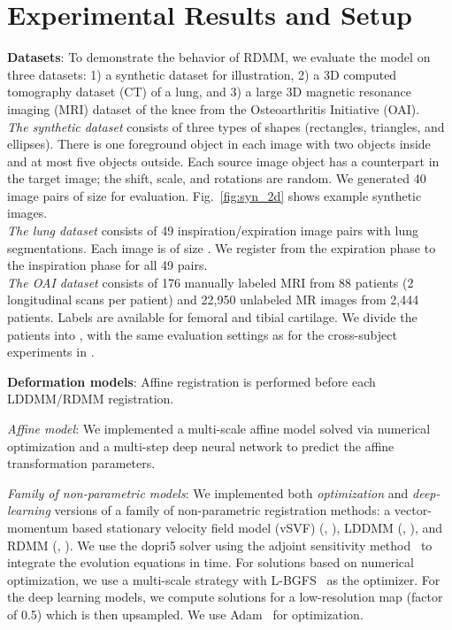 \documentclass{article}
\numberwithin{equation}{section}
\newcommand{\zy}[1]{{\color{black}{#1}}}
\begin{document}
\section{Experimental Results and Setup}
\label{sec:experimental_results}
 {\bf Datasets}: To demonstrate the behavior of RDMM, we evaluate the model on three datasets: 1) a synthetic dataset for illustration, 2) a 3D computed tomography dataset (CT) of a lung, and 3) a large 3D magnetic resonance imaging (MRI) dataset of the knee from the Osteoarthritis Initiative (OAI).\\
{\it The synthetic dataset} consists of three types of shapes (rectangles, triangles, and ellipses). There is one foreground object in each image with two objects inside and at most five objects outside. Each source image object  has a counterpart in the target image; the shift, scale, and rotations are random. We generated 40 image pairs of size  for evaluation. Fig.~\ref{fig:syn_2d} shows example synthetic images.\\
{\it The lung dataset} consists of 49 inspiration/expiration image pairs with lung segmentations. Each image is of size . We register from the expiration phase to the inspiration phase for all 49 pairs.\\
{\it The OAI dataset} consists of 176 manually labeled MRI from 88 patients (2 longitudinal scans per patient) and 22,950 unlabeled MR images from 2,444 patients. Labels are available for femoral and tibial cartilage. We divide the patients into \zy{training (2,800 pairs),  validation (50 pairs) and testing groups (300 pairs)}, with the same evaluation settings as for the cross-subject experiments in \cite{shen2019networks}.

{\bf Deformation models}: Affine registration is performed before each LDDMM/RDMM registration.

{\it Affine model}:
We implemented a multi-scale affine model solved via numerical optimization and a multi-step deep neural network to predict the affine transformation parameters.

{\it Family of non-parametric models}: We implemented both {\it optimization} and {\it deep-learning} versions of a family of non-parametric registration methods: a vector-momentum based stationary velocity field model (vSVF) (, ), LDDMM (, ), and RDMM (, ). We use the dopri5 solver using the adjoint sensitivity method~\citep{chen2018neural} to integrate the evolution equations in time. For solutions based on numerical optimization, we use a multi-scale strategy with L-BGFS~\cite{liu1989limited} as the optimizer. For the deep learning models, we compute solutions for a low-resolution map (factor of 0.5) which is then upsampled. We use Adam~\cite{kingma2014adam} for optimization.
\end{document}
